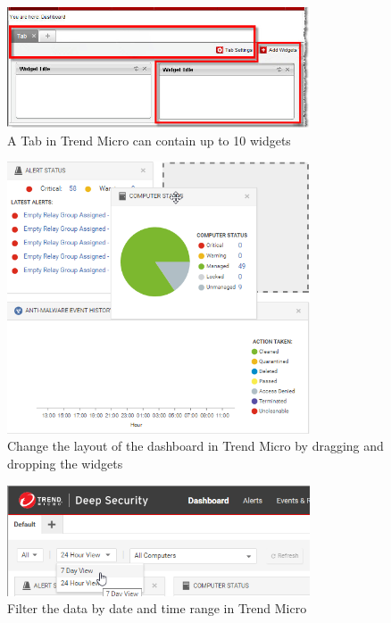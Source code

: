 \begin{figure}[htbp]
      \centering
      \includegraphics[width=0.8\textwidth]{Figures/Trend Micro/tABS.jpg}
      \caption{A Tab in Trend Micro can contain up to 10 widgets}
\end{figure}

\begin{figure}[htbp]
      \centering
      \includegraphics[width=0.8\textwidth]{Figures/Trend Micro/darg-and-drop.png}
      \caption{Change the layout of the dashboard in Trend Micro by dragging and dropping the widgets}
\end{figure}

\begin{figure}[htbp]
      \centering
      \includegraphics[width=0.8\textwidth]{Figures/Trend Micro/date-time-range.png}
      \caption{Filter the data by date and time range in Trend Micro}
\end{figure}

